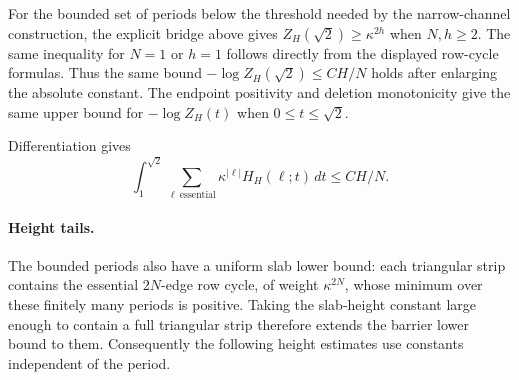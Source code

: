 For the bounded set of periods below the threshold needed by the narrow-channel construction, the explicit bridge above gives $Z_H(\sqrt2)\ge\kappa^{2h}$ when $N,h\ge2$. The same inequality for $N=1$ or $h=1$ follows directly from the displayed row-cycle formulas. Thus the same bound $-\log Z_H(\sqrt2)\le CH/N$ holds after enlarging the absolute constant. The endpoint positivity and deletion monotonicity give the same upper bound for $-\log Z_H(t)$ when $0\le t\le\sqrt2$.

Differentiation gives
\begin{equation}\label{eq:cylinder-integrated-ratio}
 \int_1^{\sqrt2}\sum_{\ell\ \mathrm{essential}}\kappa^{|\ell|}H_H(\ell;t)\,dt
 \le C H/N.
\end{equation}
\paragraph{Height tails.}
The bounded periods also have a uniform slab lower bound: each triangular strip contains the essential $2N$-edge row cycle, of weight $\kappa^{2N}$, whose minimum over these finitely many periods is positive. Taking the slab-height constant large enough to contain a full triangular strip therefore extends the barrier lower bound to them. Consequently the following height estimates use constants independent of the period.

